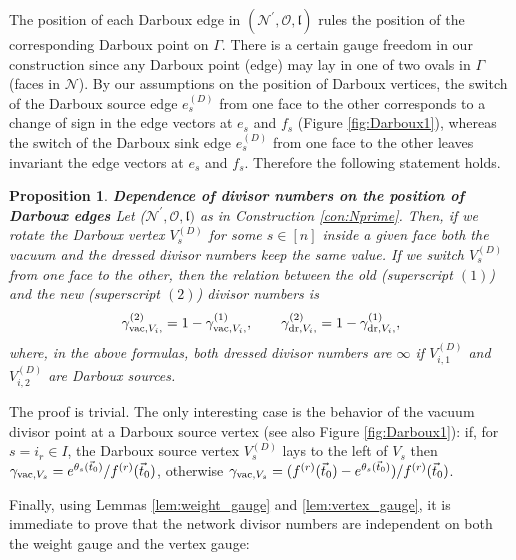 \documentclass[11pt]{amsart}
\theoremstyle{plain}
\numberwithin{equation}{section}
\newtheorem{proposition}[theorem]{Proposition}
\begin{document}
The position of each Darboux edge in $(\mathcal N^{\prime},\mathcal O, \mathfrak{l})$ rules the position of the corresponding Darboux point on $\Gamma$. There is a certain gauge freedom in our construction since any Darboux point (edge) may lay in one of two ovals in $\Gamma$ (faces in $\mathcal N$). By our assumptions on the position of Darboux vertices, the switch of the Darboux source edge $e^{(D)}_s$ from one face to the other corresponds to a change of sign in the edge vectors at $e_s$ and $f_s$ (Figure \ref{fig:Darboux1}), whereas the switch of the Darboux sink edge $e^{(D)}_s$ from one face to the other leaves invariant the edge vectors at $e_s$ and $f_s$. Therefore the following statement holds.

\begin{proposition}\label{prop:darboux}\textbf{Dependence of divisor numbers on the position of Darboux edges}
Let ($\mathcal N^{\prime}, \mathcal O, \mathfrak l)$ as in Construction \ref{con:Nprime}. Then, if we rotate the Darboux vertex $V^{(D)}_s$ for some $s\in [n]$ inside a given face both the vacuum and the dressed divisor numbers keep the same value. If we switch $V^{(D)}_s$ from one face to the other, then the relation between the old (superscript $(1)$) and the new (superscript $(2)$) divisor numbers is
\begin{equation}\label{eq:div_no_Darboux_pos}
\gamma_{\textup{\scriptsize vac},V_i,}^{(2)} = 1-\gamma_{\textup{\scriptsize vac},V_i,}^{(1)},\quad\quad \gamma_{\textup{\scriptsize dr},V_i,}^{(2)} = 1-\gamma_{\textup{\scriptsize dr},V_i,}^{(1)},
\end{equation}
where, in the above formulas, both dressed divisor numbers are $\infty$ if $V^{(D)}_{i,1}$ and $V^{(D)}_{i,2}$ are Darboux sources.
\end{proposition}

The proof is trivial. The only interesting case is the behavior of the vacuum divisor point at a Darboux source vertex (see also Figure \ref{fig:Darboux1}): if, for $s=i_r\in I$, the Darboux source vertex $V^{(D)}_s$ lays to the left of $V_s$ then $\gamma_{\textup{\scriptsize vac},V_s} = e^{\theta_{s}(\vec t_0)}/f^{(r)}(\vec t_0)$, otherwise $\gamma_{\textup{\scriptsize vac},V_s} = (f^{(r)}(\vec t_0)-e^{\theta_{s}(\vec t_0)})/f^{(r)}(\vec t_0)$.

Finally, using Lemmas \ref{lem:weight_gauge} and \ref{lem:vertex_gauge}, it is immediate to prove that the network divisor numbers are independent on both the weight gauge and the vertex gauge:
\end{document}
